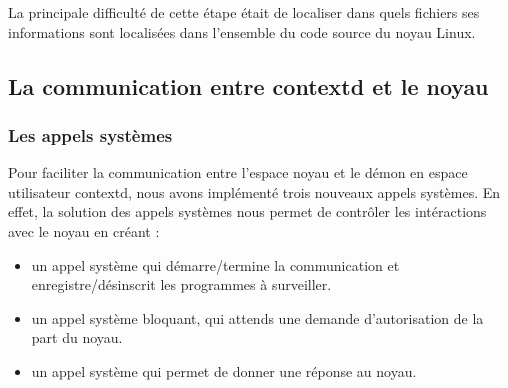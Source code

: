 La principale difficulté de cette étape était de localiser dans quels fichiers ses informations sont localisées dans l'ensemble du code source du noyau Linux.

% 
% 
% 
% 

\subsection{La communication entre contextd et le noyau}

\subsubsection{Les appels systèmes}

Pour faciliter la communication entre l'espace noyau et le démon en espace utilisateur contextd, nous avons implémenté trois nouveaux appels systèmes. En effet, la solution des appels systèmes nous permet de contrôler les intéractions avec le noyau en créant :
\begin{itemize}
 \item un appel système qui démarre/termine la communication et enregistre/désinscrit les programmes à surveiller.
 \item un appel système bloquant, qui attends une demande d'autorisation de la part du noyau.
 \item un appel système qui permet de donner une réponse au noyau.
\end{itemize}

